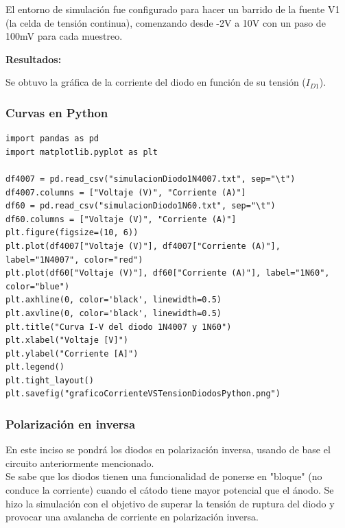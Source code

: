 
\sangria{} El entorno de simulación fue configurado para hacer un barrido de la fuente V1 (la celda de tensión continua), comenzando desde -2V a 10V con un paso de 100mV para cada muestreo.

\newpage\thispagestyle{fancy}
\textbf{Resultados:}

\sangria{} Se obtuvo la gráfica de la corriente del diodo en función de su tensión ($I_{D1}$). 



\inicioCodigo{}

\subsubsection{Curvas en Python}

\begin{verbatim}
import pandas as pd 
import matplotlib.pyplot as plt 

df4007 = pd.read_csv("simulacionDiodo1N4007.txt", sep="\t")
df4007.columns = ["Voltaje (V)", "Corriente (A)"]
df60 = pd.read_csv("simulacionDiodo1N60.txt", sep="\t")
df60.columns = ["Voltaje (V)", "Corriente (A)"]
plt.figure(figsize=(10, 6))
plt.plot(df4007["Voltaje (V)"], df4007["Corriente (A)"], label="1N4007", color="red")
plt.plot(df60["Voltaje (V)"], df60["Corriente (A)"], label="1N60", color="blue")
plt.axhline(0, color='black', linewidth=0.5)
plt.axvline(0, color='black', linewidth=0.5)
plt.title("Curva I-V del diodo 1N4007 y 1N60")
plt.xlabel("Voltaje [V]")
plt.ylabel("Corriente [A]")
plt.legend()
plt.tight_layout()
plt.savefig("graficoCorrienteVSTensionDiodosPython.png")
\end{verbatim}


\finalCodigo{}

\subsubsection{Polarización en inversa}
\sangria{} En este inciso se pondrá los diodos en polarización inversa, usando de base el circuito anteriormente mencionado. \\
\sangria{} Se sabe que los diodos tienen una funcionalidad de ponerse en "bloque" (no conduce la corriente) cuando el cátodo tiene mayor potencial que el ánodo. Se hizo la simulación con el objetivo de superar la tensión de ruptura del diodo y provocar una avalancha de corriente en polarización inversa. 

